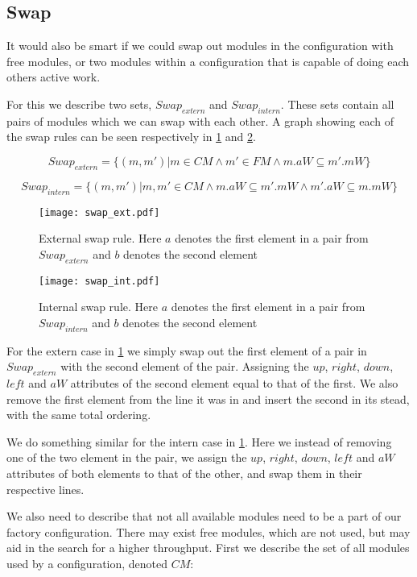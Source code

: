 \subsection{Swap}
It would also be smart if we could swap out modules in the configuration with free modules, or two modules within a configuration that is capable of doing each others active work.

For this we describe two sets, $Swap_{extern}$ and $Swap_{intern}$. These sets contain all pairs of modules which we can swap with each other. A graph showing each of the swap rules can be seen respectively in \cref{fig:swap_ext} and \cref{fig:swap_int}.

\[Swap_{extern} = \{(m, m') | m \in CM \land m' \in FM \land m.aW \subseteq m'.mW \}\]

\[Swap_{intern} = \{(m, m') | m, m' \in CM \land m.aW \subseteq m'.mW \land m'.aW \subseteq m.mW \}\]

\begin{figure}[h]
\centering
\texttt{[image: swap\_ext.pdf]}
\caption{External swap rule. Here $a$ denotes the first element in a pair from $Swap_{extern}$ and $b$ denotes the second element}
\label{fig:swap_ext}
\end{figure}

\begin{figure}[h]
\centering
\texttt{[image: swap\_int.pdf]}
\caption{Internal swap rule. Here $a$ denotes the first element in a pair from $Swap_{intern}$ and $b$ denotes the second element}
\label{fig:swap_int}
\end{figure}

For the extern case in \cref{fig:swap_ext} we simply swap out the first element of a pair in $Swap_{extern}$ with the second element of the pair. Assigning the $up$, $right$, $down$, $left$ and $aW$ attributes of the second element equal to that of the first. We also remove the first element from the line it was in and insert the second in its stead, with the same total ordering.

We do something similar for the intern case in \cref{fig:swap_ext}. Here we instead of removing one of the two element in the pair, we assign the $up$, $right$, $down$, $left$ and $aW$ attributes of both elements to that of the other, and swap them in their respective lines.

We also need to describe that not all available modules need to be a part of our factory configuration. There may exist free modules, which are not used, but may aid in the search for a higher throughput. First we describe the set of all modules used by a configuration, denoted $CM$:


